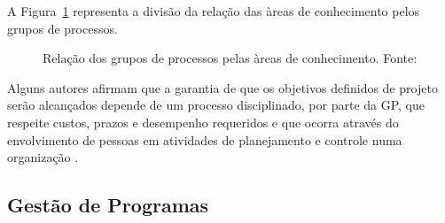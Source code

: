   A Figura~\ref{processos_areas_pmbok} representa a divisão da relação das àreas de conhecimento pelos grupos de processos.

  \begin{figure}[ht]
    \centering
    \caption{Relação dos grupos de processos pelas àreas de conhecimento. Fonte: \cite{pmiguide2014}}
    \label{processos_areas_pmbok}
  \end{figure}

  Alguns autores afirmam que a garantia de que os objetivos definidos de projeto serão alcançados depende de um processo disciplinado, por parte da GP, que respeite custos, prazos e desempenho requeridos e que ocorra através do envolvimento de pessoas em atividades de planejamento e controle numa organização \cite{dinsmore2009ama, meredith2011project}.

\subsection{Gestão de Programas}


